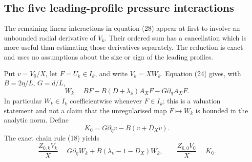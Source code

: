 \subsection{The five leading-profile pressure interactions}
\label{subsec:leading-profile-pressure}

The remaining linear interactions in equation (28) appear at first to
involve an unbounded radial derivative of $V_k$. Their ordered sum has
a cancellation which is more useful than estimating those derivatives
separately. The reduction is exact and uses no assumptions about the
size or sign of the leading profiles.

Put $v=V_0/X$, let $F=U_k\in I_k$, and write $V_k=XW_k$.
Equation (24) gives, with $B=2\eta/L$, $G=d/L$,
\begin{equation}\label{eq:leading-W}
 W_k=BF-B(D+\lambda_k)A_XF-G\partial_\eta A_XF.
\end{equation}
In particular $W_k\in I_k$ coefficientwise whenever $F\in I_k$;
this is a valuation statement and not a claim that the unregularised
map $F\mapsto W_k$ is bounded in the analytic norm. Define
\begin{equation}\label{eq:leading-K0}
 K_0=G\partial_\eta v-B(v+D_Xv).
\end{equation}
The exact chain rule (18) yields
\[
 \frac{Z_{0,k}V_k}{X}
  =G\partial_\eta W_k+B(\lambda_k-1-D_X)W_k,
 \qquad \frac{Z_{0,0}V_0}{X}=K_0.
\]

